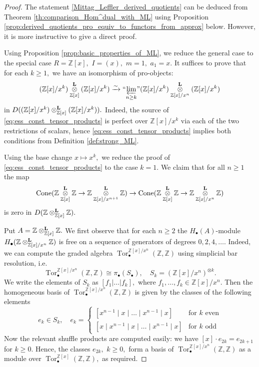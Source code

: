 \documentclass[11pt,leqno]{amsart}
\numberwithin{equation}{section}
\def\bL{\mathbb{L}}
\def\Z{\mathbb{Z}}
\def\bL{{\mathbf L}}
\newcommand{\Ltens}[1]{%
  \mathbin{\mathop{\otimes}\displaylimits^{\bL}_{#1}}%
}
\newcommand{\prolim}[1][]{\mathop{\varprojlim}\limits_{#1}}
\newcommand{\proolim}[1][]{{``{\prolim[#1]}"}}
\newcommand{\xto}{\xrightarrow}
\newcommand{\Cone}{\operatorname{Cone}}
\newcommand{\Tor}{\operatorname{Tor}}
\begin{document}
\begin{proof}
The statement \ref{Mittag_Leffler_derived_quotients} can be deduced from Theorem \ref{th:comparison_Hom^dual_with_ML} using Proposition \ref{prop:derived_quotients_pro_equiv_to_functors_from_approx} below. However, it is more instructive to give a direct proof.

Using Proposition \ref{prop:basic_properties_of_ML}, we reduce the general case to the special case $R=\Z[x],$ $I=(x),$ $m=1,$ $a_1=x.$ It suffices to prove that for each $k\geq 1,$ we have an isomorphism of pro-objects:
\begin{equation}\label{eq:ess_const_tensor_products}
(\Z[x]/x^k)\Ltens{\Z[x]}(\Z[x]/x^k)\xto{\sim}\proolim[n\geq k](\Z[x]/x^k)\Ltens{\Z[x]/x^n}(\Z[x]/x^k)
\end{equation}
in $D((\Z[x]/x^k)\Ltens{\Z[x]}(\Z[x]/x^k)).$ Indeed, the source of \eqref{eq:ess_const_tensor_products} is perfect over $\Z[x]/x^k$ via each of the two restrictions of scalars, hence \eqref{eq:ess_const_tensor_products} implies both conditions from Definition \ref{def:strong_ML}.

Using the base change $x\mapsto x^k,$ we reduce the proof of \eqref{eq:ess_const_tensor_products} to the case $k=1.$ We claim that for all $n\geq 1$ the map
\begin{equation}\label{eq:zero_map_in_tensor_products}
\Cone(\Z\Ltens{\Z[x]}\Z\to\Z\Ltens{\Z[x]/x^{n+1}}\Z)\to \Cone(\Z\Ltens{\Z[x]}\Z\to\Z\Ltens{\Z[x]/x^n}\Z)\end{equation}
is zero in $D(\Z\Ltens{\Z[x]}\Z).$ 

Put $A=\Z\Ltens{\Z[x]}\Z.$ We first observe that for each $n\geq 2$ the $H_{\bullet}(A)$-module $H_{\bullet}(\Z\Ltens{\Z[x]/x^n}\Z)$ is free on a sequence of generators of degrees $0,2,4,\dots.$ Indeed, we can compute the graded algebra $\Tor_{\bullet}^{\Z[x]/x^n}(\Z,\Z)$ using simplicial bar resolution, i.e.
\begin{equation*}
\Tor_{\bullet}^{\Z[x]/x^n}(\Z,\Z)\cong\pi_{\bullet}(S_{\bullet}),\quad S_k=(\Z[x]/x^n)^{\otimes k}.
\end{equation*}
We write the elements of $S_k$ as $[f_1|\dots | f_k],$ where $f_1,\dots,f_k\in\Z[x]/x^n.$ Then the homogeneous basis of $\Tor_{\bullet}^{\Z[x]/x^n}(\Z,\Z)$
is given by the classes of the following elements
\begin{equation*}
e_k\in S_k,\quad e_k = \begin{cases}[x^{n-1}\mid x\mid\dots\mid x^{n-1}\mid x] & \text{for }k\text{ even}\\
[x\mid x^{n-1}\mid x\mid\dots\mid x^{n-1}\mid x] & \text{for }k\text{ odd} \end{cases}
\end{equation*}
Now the relevant shuffle products are computed easily: we have $[x]\cdot e_{2k}=e_{2k+1}$ for $k\geq 0.$ Hence, the classes $e_{2k},$ $k\geq 0,$ form a basis of $\Tor_{\bullet}^{\Z[x]/x^n}(\Z,\Z)$ as a module over $\Tor_{\bullet}^{\Z[x]}(\Z,\Z),$ as required.


\end{proof}
\end{document}
